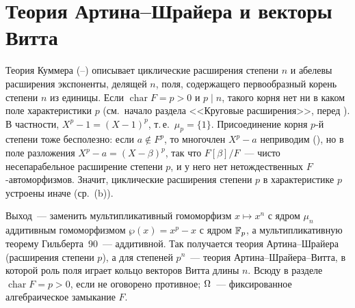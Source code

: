 \section{Теория Артина--Шрайера и векторы Витта}

Теория Куммера (--) описывает циклические расширения степени $n$ и абелевы расширения экспоненты, делящей $n$,
поля, содержащего первообразный корень степени $n$ из единицы. Если $\operatorname{char}F=p>0$ и $p\mid n$, такого корня
нет ни в каком поле характеристики $p$ (см.\ начало раздела <<Круговые расширения>>, перед ). В частности,
$X^p-1=(X-1)^p$, т.\,е.\ $\mu_p=\{1\}$. Присоединение корня $p$-й степени тоже бесполезно: если $a\notin F^p$,
то многочлен $X^p-a$ неприводим (), но в поле разложения $X^p-a=(X-\beta)^p$, так что $F[\beta]/F$~--- чисто
несепарабельное расширение степени $p$, и у него нет нетождественных $F$-автоморфизмов. Значит, циклические расширения
степени $p$ в характеристике $p$ устроены иначе (ср.\ (b)).

Выход~--- заменить мультипликативный гомоморфизм $x\mapsto x^n$ с ядром $\mu_n$ аддитивным гомоморфизмом
$\wp(x)=x^p-x$ с ядром $\mathbb F_p$, а мультипликативную теорему Гильберта~90~--- аддитивной. Так получается теория
Артина--Шрайера (расширения степени $p$), а для степеней $p^n$~--- теория Артина--Шрайера--Витта, в которой роль поля
играет кольцо векторов Витта длины $n$. Всюду в разделе $\operatorname{char}F=p>0$, если не оговорено противное; $\Omega$~---
фиксированное алгебраическое замыкание $F$.

\begin{center}
\end{center}

